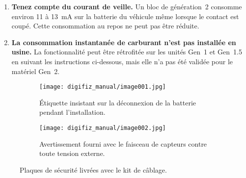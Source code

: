 \begin{enumerate}
    \item \textbf{Tenez compte du courant de veille.} Un bloc de génération~2 consomme environ 11 à 13~mA sur la batterie du véhicule même lorsque le contact est coupé. Cette consommation au repos ne peut pas être réduite.
    \item \textbf{La consommation instantanée de carburant n'est pas installée en usine.} La fonctionnalité peut être rétrofitée sur les unités Gen~1 et Gen~1.5 en suivant les instructions ci-dessous, mais elle n'a pas été validée pour le matériel Gen~2.
\end{enumerate}

\begin{figure}[htbp]
    \centering
    \begin{subfigure}{0.46\textwidth}
        \texttt{[image: digifiz\_manual/image001.jpg]}
        \caption{Étiquette insistant sur la déconnexion de la batterie pendant l'installation.}
    \end{subfigure}\hfill
    \begin{subfigure}{0.46\textwidth}
        \texttt{[image: digifiz\_manual/image002.jpg]}
        \caption{Avertissement fourni avec le faisceau de capteurs contre toute tension externe.}
    \end{subfigure}
    \caption{Plaques de sécurité livrées avec le kit de câblage.}
\end{figure}
